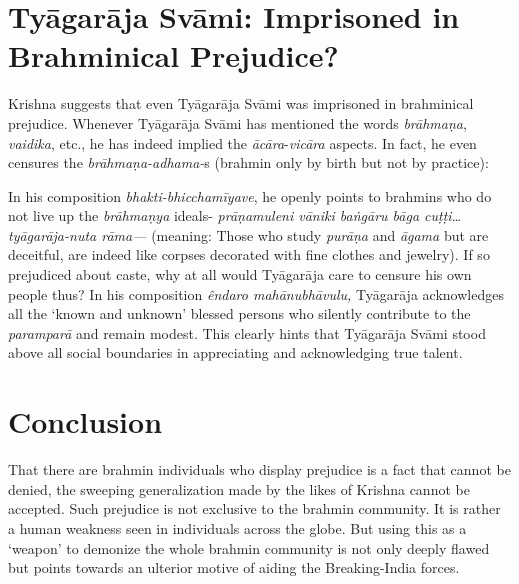 \section*{Tyāgarāja Svāmi: Imprisoned in Brahminical Prejudice?}

Krishna suggests that even Tyāgarāja Svāmi was imprisoned in brahminical prejudice. Whenever Tyāgarāja Svāmi has mentioned the words \textit{brāhmaṇa}, \textit{vaidika}, etc., he has indeed implied the \textit{ācāra}-\textit{vicāra} aspects. In fact, he even censures the \textit{brāhmaṇa-adhama-}s (brahmin only by birth but not by practice):

In his composition \textit{bhakti-bhicchamīyave}, he openly points to brahmins who do not live up the \textit{brāhmaṇya} ideals- \textit{prāṇamuleni vāniki baṅgāru bāga cuṭṭi…tyāgarāja-nuta rāma—} (meaning: Those who study \textit{purāṇa} and \textit{āgama} but are deceitful, are indeed like corpses decorated with fine clothes and jewelry). If so prejudiced about caste, why at all would Tyāgarāja care to censure his own people thus? In his composition \textit{êndaro mahānubhāvulu,} Tyāgarāja acknowledges all the ‘known and unknown’ blessed persons who silently contribute to the \textit{paramparā} and remain modest. This clearly hints that Tyāgarāja Svāmi stood above all social boundaries in appreciating and acknowledging true talent.

\vspace{-.4cm}

\section*{Conclusion}

\vspace{-.2cm}

That there are brahmin individuals who display prejudice is a fact that cannot be denied, the sweeping generalization made by the likes of Krishna cannot be accepted. Such prejudice is not exclusive to the brahmin community. It is rather a human weakness seen in individuals across the globe. But using this as a ‘weapon’ to demonize the whole brahmin community is not only deeply flawed but points towards an ulterior motive of aiding the Breaking-India forces.

